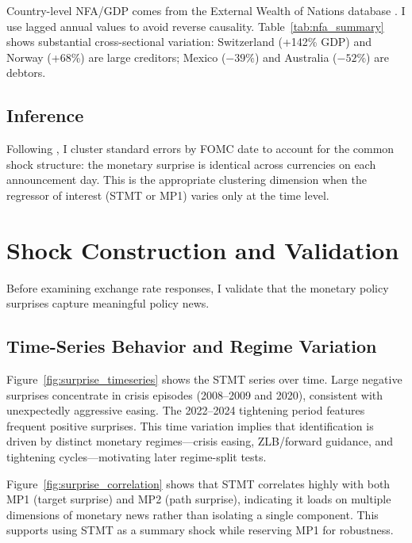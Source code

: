 \documentclass[12pt]{article}
\begin{document}
Country-level NFA/GDP comes from the External Wealth of Nations database \citep{lane2018external}. I use lagged annual values to avoid reverse causality. Table~\ref{tab:nfa_summary} shows substantial cross-sectional variation: Switzerland (+142\% GDP) and Norway (+68\%) are large creditors; Mexico ($-39\%$) and Australia ($-52\%$) are debtors.

\subsection{Inference}

Following \citet{petersen2009estimating}, I cluster standard errors by FOMC date to account for the common shock structure: the monetary surprise is identical across currencies on each announcement day. This is the appropriate clustering dimension when the regressor of interest (STMT or MP1) varies only at the time level.

\section{Shock Construction and Validation}
\label{sec:validation}

Before examining exchange rate responses, I validate that the monetary policy surprises capture meaningful policy news.

\subsection{Time-Series Behavior and Regime Variation}

Figure~\ref{fig:surprise_timeseries} shows the STMT series over time. Large negative surprises concentrate in crisis episodes (2008--2009 and 2020), consistent with unexpectedly aggressive easing. The 2022--2024 tightening period features frequent positive surprises. This time variation implies that identification is driven by distinct monetary regimes---crisis easing, ZLB/forward guidance, and tightening cycles---motivating later regime-split tests.

Figure~\ref{fig:surprise_correlation} shows that STMT correlates highly with both MP1 (target surprise) and MP2 (path surprise), indicating it loads on multiple dimensions of monetary news rather than isolating a single component. This supports using STMT as a summary shock while reserving MP1 for robustness.
\end{document}
